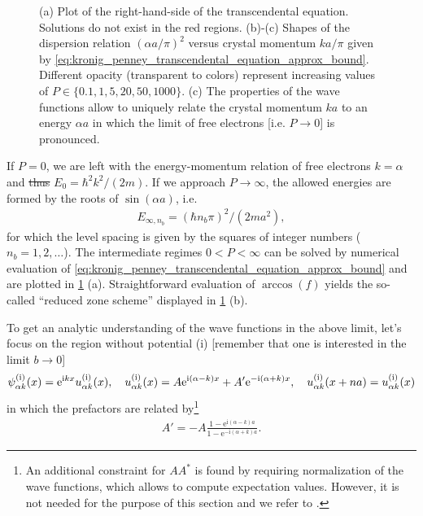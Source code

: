 \documentclass{svmono}
\def\ri{\mathrm i}
\def\re{\mathrm e}
\providecommand{\DIFdeltex}[1]{{\protect\color{red}\sout{#1}}}                      %
\providecommand{\DIFdelbegin}{} %
\providecommand{\DIFdelend}{} %
\providecommand{\DIFdel}[1]{\texorpdfstring{\DIFdeltex{#1}}{}} %
\newcommand{\DIFscaledelfig}{0.5}
\newlength{\DIFdelgraphicswidth} %
\newlength{\DIFdelgraphicsheight} %
\newcommand{\DIFdelincludegraphics}[2][]{%
\sbox{\DIFdelgraphicsbox}{\DIFOincludegraphics[#1]{#2}}%
\settoboxwidth{\DIFdelgraphicswidth}{\DIFdelgraphicsbox} %
\settoboxtotalheight{\DIFdelgraphicsheight}{\DIFdelgraphicsbox} %
\scalebox{\DIFscaledelfig}{%
\parbox[b]{\DIFdelgraphicswidth}{\usebox{\DIFdelgraphicsbox}\\[-\baselineskip] \rule{\DIFdelgraphicswidth}{0em}}\llap{\resizebox{\DIFdelgraphicswidth}{\DIFdelgraphicsheight}{%
\setlength{\unitlength}{\DIFdelgraphicswidth}%
\begin{picture}(1,1)%
\thicklines\linethickness{2pt} %
{\color[rgb]{1,0,0}\put(0,0){\framebox(1,1){}}}%
{\color[rgb]{1,0,0}\put(0,0){\line( 1,1){1}}}%
{\color[rgb]{1,0,0}\put(0,1){\line(1,-1){1}}}%
\end{picture}%
}\hspace*{3pt}}} %
} %
\DeclareRobustCommand{\DIFdelbegin}{\DIFOdelbegin \let\includegraphics\DIFdelincludegraphics} %
\DeclareRobustCommand{\DIFdelend}{\DIFOaddend \let\includegraphics\DIFOincludegraphics} %
\begin{document}
\begin{figure}
    \caption{
    (a) Plot of the right-hand-side of the transcendental equation. Solutions do not exist in the red regions.
    (b)-(c) Shapes of the dispersion relation $(\alpha a/\pi)^2$ versus crystal momentum $ka/\pi$ given by \cref{eq:kronig_penney_transcendental_equation_approx_bound}.
    Different opacity (transparent to colors) represent increasing values of $P\in\{0.1,1,5,20,50,1000\}$.
    (c) The properties of the wave functions allow to uniquely relate the crystal momentum $ka$ to an energy $\alpha a$ in which the limit of free electrons [i.e. $P\rightarrow0$] is pronounced.}
    \label{fig:kronig_penney_dispersion}
\end{figure}

If $P=0$, we are left with the energy-momentum relation of free electrons $k=\alpha$ and \DIFdelbegin \DIFdel{thus }\DIFdelend $E_0={\hbar^2k^2}/({2m})$.
If we approach $P\rightarrow\infty$, the allowed energies are formed by the roots of $\sin(\alpha a)$, i.e.
\begin{align}
    E_{\infty,n_b}=(\hbar n_b\pi)^2/(2ma^2),
    \label{eq:kronig_penney_energy_tb}
\end{align}
for which the level spacing is given by the squares of integer numbers ($n_b=1,2,\dots$).
The intermediate regimes $0<P<\infty$ can be solved by numerical evaluation of \cref{eq:kronig_penney_transcendental_equation_approx_bound} and are plotted in \cref{fig:kronig_penney_dispersion} (a).
Straightforward evaluation of $\arccos(f)$ yields the so-called ``reduced zone scheme'' displayed in \cref{fig:kronig_penney_dispersion} (b).

To get an analytic understanding of the wave functions in the above limit, let's focus on the region without potential (i) [remember that one is interested in the limit $b\rightarrow0$]
\begin{align}
    \psi_{\alpha k}^{\rm (i)}(x) = \re^{\ri kx}u_{\alpha k}^{\rm (i)}(x),
    \quad
    u_{\alpha k}^{\rm (i)}(x) = A\re^{\ri(\alpha-k) x} + A'\re^{-\ri(\alpha+k) x},
    \quad
    u_{\alpha k}^{\rm (i)}(x+na)=u_{\alpha k}^{\rm (i)}(x)
    \label{eq:kronig_penney_wavefunctions}
\end{align}
in which the prefactors are related by\footnote{An additional constraint for $AA^*$ is found by requiring normalization of the wave functions, which allows to compute expectation values. However, it is not needed for the purpose of this section and we refer to \cite{KronigPenney1931}.}
\begin{align}
    A' = -A\frac{1-\re^{\ri(\alpha-k)a}}{1-\re^{-\ri(\alpha+k)a}}.
    \label{eq:kronig_penney_constants}
\end{align}
\end{document}
